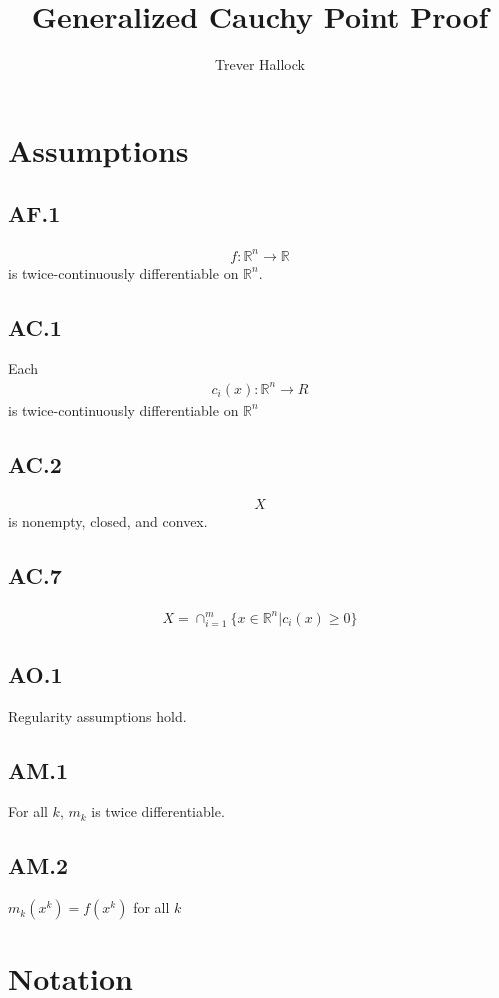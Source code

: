 \documentclass{article}
\title{Generalized Cauchy Point Proof}
\author{Trever Hallock}
\theoremstyle{case}
\begin{document}
\section{Assumptions}

\subsection{AF.1}
\begin{align}
f: \mathbb R^n \to \mathbb R
\end{align}
is twice-continuously differentiable on $\mathbb R^n$.

\subsection{AC.1}
Each
\begin{align}
c_i(x): \mathbb R^n \to R
\end{align}
is twice-continuously differentiable on $\mathbb R^n$

\subsection{AC.2}
\begin{align}
X
\end{align}
is nonempty, closed, and convex.


\subsection{AC.7}
\begin{align}
X = \cap_{i=1}^{m} \{x\in\mathbb R^n|c_i(x) \ge 0\}
\end{align}


\subsection{AO.1}
Regularity assumptions hold.

\subsection{AM.1}
For all $k$, $m_k$ is twice differentiable.

\subsection{AM.2}
$m_k(x^k) = f(x^k)$ for all $k$

\section{Notation}
\end{document}
